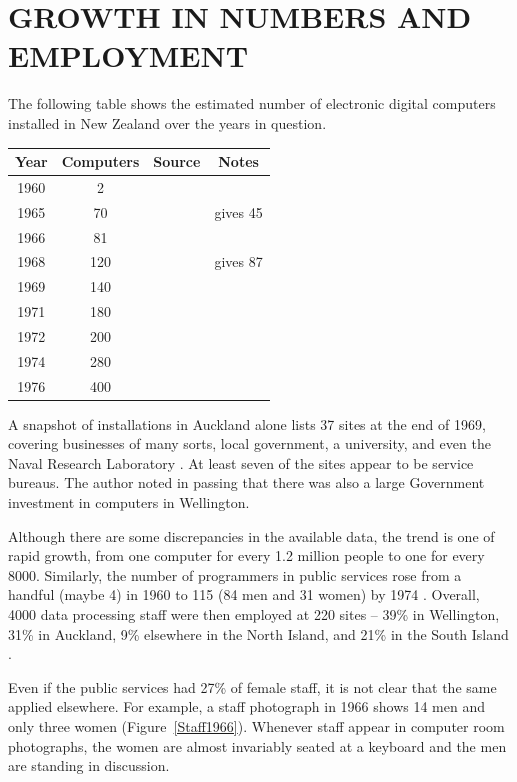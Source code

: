 \documentclass{IEEEcsmag}
\begin{document}
\vspace*{-8pt}
\section{GROWTH IN NUMBERS AND EMPLOYMENT}

The following table shows the estimated number of electronic digital computers installed in New Zealand over the years in question.

\begin{center}
\begin{tabular}{ |c|c|c|c| } 
 \hline
 Year & Computers & Source & Notes\\ 
\hline
1960 & 2 & \cite{FirstCinNZ}&\\ 
1965 & 70 & \cite{Beardon} & \cite{HoneHeke} gives 45\\ 
1966 & 81 & \cite{Beardon}&\\
1968 & 120 & \cite{Beardon} & \cite{Yearbook75} gives 87\\
1969 & 140 & \cite{Beardon}&\\
1971 & 180 & \cite{Beardon}&\\
1972 & 200 & \cite{Yearbook75}&\\
1974 & 280 & \cite{Beardon}&\\
1976 & 400 & \cite{Beardon}&\\
 \hline
\end{tabular}
\end{center}

A snapshot of installations in Auckland alone lists 37 sites at the end of 1969, covering businesses of many sorts, local government, a university, and even the Naval Research Laboratory \cite{Auburn1971}. At least seven of the sites appear to be service bureaus. The author noted in passing that there was also a large Government investment in computers in Wellington.

Although there are some discrepancies in the available data, the trend is one of rapid growth, from one computer for every 1.2 million people to one for every 8000. Similarly, the number of programmers in public services rose from a handful (maybe 4) in 1960 to 115 (84 men and
31 women) by 1974 \cite{Yearbook75}. Overall, 4000 data processing staff were then employed at  220 sites -- 39\% in Wellington, 31\% in Auckland, 9\% elsewhere in the North Island, and 21\% in the South Island \cite{Beardon}.

Even if the public services had 27\% of female staff, it is not clear that the same applied elsewhere. For example, a staff photograph in 1966 shows 14 men and only three women (Figure~\ref{Staff1966}). Whenever staff appear in computer room photographs, the women are almost invariably seated at a keyboard and the men are standing in discussion.
\end{document}
